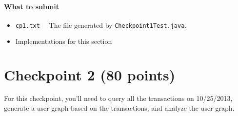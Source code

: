 \documentclass[letterpaper,12pt]{report}
\begin{document}
\paragraph{What to submit} 
\begin{itemize}
	\item \texttt{cp1.txt} \ \  The file generated by \texttt{Checkpoint1Test.java}.
	\item Implementations for this section
\end{itemize}

\newpage

\section{Checkpoint 2 (80 points)}
\label{sec:checkpoint2}

For this checkpoint, you'll need to query all the transactions on 10/25/2013, generate a user graph based on the transactions, and analyze the user graph. 
\end{document}
